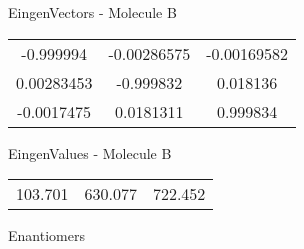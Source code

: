 \begin{multicols}{2}
\begin{center}
\vtab
 EingenVectors - Molecule B     \\
\vtab
\begin{tabular}{|c c c|}
-0.999994	 & 	-0.00286575	 & 	-0.00169582	 \\
0.00283453	 & 	-0.999832	 & 	0.018136	 \\
-0.0017475	 & 	0.0181311	 & 	0.999834
\end{tabular}

\vtab
 EingenValues - Molecule B     \\
\vtab
\begin{tabular}{|c c c|}
103.701	 & 	630.077	 & 	722.452	 \\
\end{tabular}

\end{center}
\end{multicols}
\begin{center}
\vtab
\vtab
\textcolor{NavyBlue}{\Large Enantiomers}
\end{center}

 \newpage

